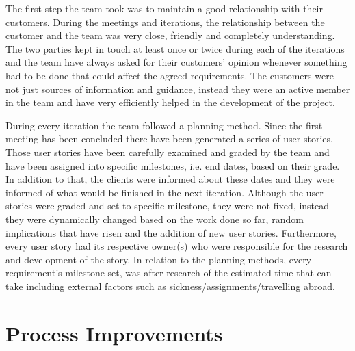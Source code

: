 \documentclass{l3proj}
\begin{document}
The first step the team took was to maintain a good relationship with their customers. During the meetings and iterations, the relationship between the customer and the team was very close, friendly and completely understanding. The two parties kept in touch at least once or twice during each of the iterations and the team have always asked for their customers' opinion whenever something had to be done that could affect the agreed requirements. The customers were not just sources of information and guidance, instead they were an active member in the team and have very efficiently helped in the development of the project.

During every iteration the team followed a planning method. Since the first meeting has been concluded there have been generated a series of user stories. Those user stories have been carefully examined and graded by the team and have been assigned into specific milestones, i.e. end dates, based on their grade. In addition to that, the clients were informed about these dates and they were informed of what would be finished in the next iteration. Although the user stories were graded and set to specific milestone, they were not fixed, instead they were dynamically changed based on the work done so far, random implications that have risen and the addition of new user stories. Furthermore, every user story had its respective owner(s) who were responsible for the research and development of the story. In relation to the planning methods, every requirement's milestone set, was after research of the estimated time that can take including external factors such as sickness/assignments/travelling abroad.


\section{Process Improvements}
\label{sec:process-improvements}

\end{document}

